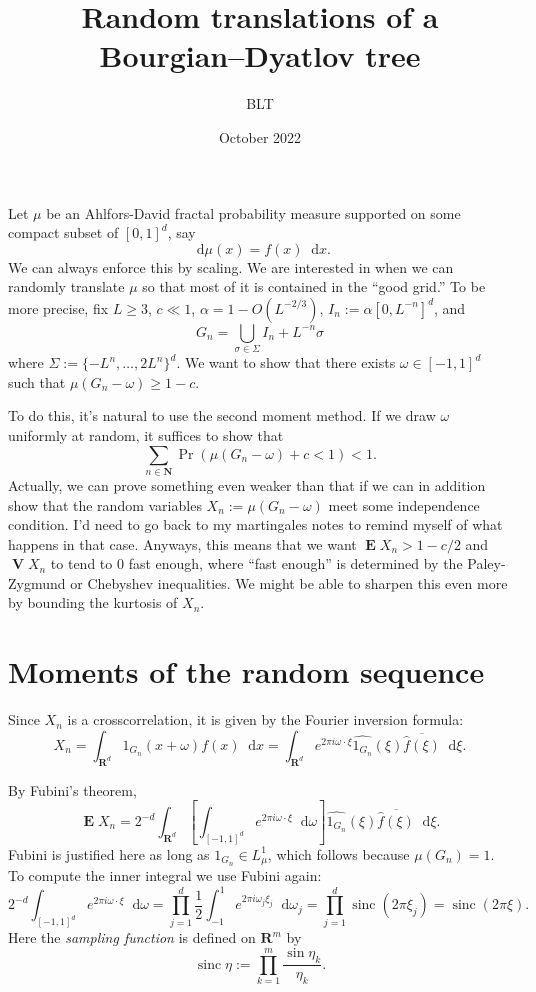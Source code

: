 \documentclass[reqno,10pt]{amsart}
\title{Random translations of a Bourgian--Dyatlov tree}
\author{BLT}
\date{October 2022}
\newcommand{\NN}{\mathbf{N}}
\newcommand{\RR}{\mathbf{R}}
\DeclareMathOperator*{\Expect}{\mathbf E}
\DeclareMathOperator*{\Var}{\mathbf V}
\newcommand*\dif{\mathop{}\!\mathrm{d}}
\DeclareMathOperator{\sinc}{sinc}
\newcommand{\dfn}[1]{\emph{#1}\index{#1}}
\theoremstyle{definition}
\numberwithin{equation}{section}
\begin{document}
\maketitle



Let $\mu$ be an Ahlfors-David fractal probability measure supported on some compact subset of $[0, 1]^d$, say 
$$\dif \mu(x) = f(x) \dif x.$$
We can always enforce this by scaling.
We are interested in when we can randomly translate $\mu$ so that most of it is contained in the ``good grid.''
To be more precise, fix $L \geq 3$, $c \ll 1$, $\alpha = 1 - O(L^{-2/3})$, $I_n := \alpha [0, L^{-n}]^d$, and
$$G_n = \bigcup_{\sigma \in \Sigma} I_n + L^{-n} \sigma$$
where $\Sigma := \{-L^n, \dots, 2L^n\}^d$.
We want to show that there exists $\omega \in [-1, 1]^d$ such that $\mu(G_n - \omega) \geq 1 - c$.

To do this, it's natural to use the second moment method.
If we draw $\omega$ uniformly at random, it suffices to show that 
$$\sum_{n \in \NN} \Pr\left(\mu(G_n - \omega) + c < 1\right) < 1.$$
Actually, we can prove something even weaker than that if we can in addition show that the random variables $X_n := \mu(G_n - \omega)$ meet some independence condition.
I'd need to go back to my martingales notes to remind myself of what happens in that case.
Anyways, this means that we want $\Expect X_n > 1 - c/2$ and $\Var X_n$ to tend to $0$ fast enough, where ``fast enough'' is determined by the Paley-Zygmund or Chebyshev inequalities.
We might be able to sharpen this even more by bounding the kurtosis of $X_n$.

\section{Moments of the random sequence}
Since $X_n$ is a crosscorrelation, it is given by the Fourier inversion formula:
$$X_n = \int_{\RR^d} 1_{G_n}(x + \omega) f(x) \dif x = \int_{\RR^d} e^{2\pi i\omega \cdot \xi} \widehat{1_{G_n}}(\xi) \overline{\hat f(\xi)} \dif \xi.$$

By Fubini's theorem,
$$\Expect X_n = 2^{-d} \int_{\RR^d} \left[\int_{[-1, 1]^d} e^{2\pi i\omega \cdot \xi} \dif \omega\right] \widehat{1_{G_n}}(\xi) \overline{\hat f(\xi)} \dif \xi.$$
Fubini is justified here as long as $1_{G_n} \in L^1_\mu$, which follows because $\mu(G_n) = 1$.
To compute the inner integral we use Fubini again:
$$2^{-d} \int_{[-1, 1]^d} e^{2\pi i\omega \cdot \xi} \dif \omega = \prod_{j = 1}^d \frac{1}{2} \int_{-1}^1 e^{2\pi i \omega_j \xi_j} \dif \omega_j = \prod_{j=1}^d \sinc(2\pi \xi_j) = \sinc(2\pi \xi).$$
Here the \dfn{sampling function} is defined on $\RR^m$ by 
$$\sinc \eta := \prod_{k=1}^m \frac{\sin \eta_k}{\eta_k}.$$
\end{document}
